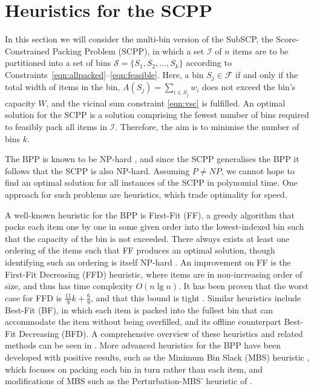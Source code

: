 \documentclass[authoryear]{elsarticle}
\begin{document}
\section{Heuristics for the SCPP}
\label{sec:heur}

\noindent In this section we will consider the multi-bin version of the SubSCP, the Score-Constrained Packing Problem (SCPP), in which a set $\mathcal{I}$ of $n$ items are to be partitioned into a set of bins $\mathcal{S} = \{S_1, S_2,\dotsc,S_k\}$ according to Constraints~\eqref{eqn:allpacked}--\eqref{eqn:feasible}. Here, a bin $S_j \in \mathcal{F}$ if and only if the total width of items in the bin, $A(S_j) = \sum_{i \in S_j} w_i$ does not exceed the bin's capacity $W$, and the vicinal sum constraint \eqref{eqn:vsc} is fulfilled. An optimal solution for the SCPP is a solution comprising the fewest number of bins required to feasibly pack all items in $\mathcal{I}$. Therefore, the aim is to minimise the number of bins $k$.

The BPP is known to be NP-hard \citep{garey1979}, and since the SCPP generalises the BPP it follows that the SCPP is also NP-hard. Assuming $P \neq NP$, we cannot hope to find an optimal solution for all instances of the SCPP in polynomial time. One approach for such problems are heuristics, which trade optimality for speed. 

A well-known heuristic for the BPP is First-Fit (FF), a greedy algorithm that packs each item one by one in some given order into the lowest-indexed bin such that the capacity of the bin is not exceeded. There always exists at least one ordering of the items such that FF produces an optimal solution, though identifying such an ordering is itself NP-hard  \citep{lewis2009}. An improvement on FF is the First-Fit Decreasing (FFD) heuristic, where items are in non-increasing order of size, and thus has time complexity $O(n\lg n)$. It has been proven that the worst case for FFD is $\frac{11}{9}k + \frac{6}{9}$, and that this bound is tight \citep{dosa2007}. Similar heuristics include Best-Fit (BF), in which each item is packed into the fullest bin that can accommodate the item without being overfilled, and its offline counterpart Best-Fit Decreasing (BFD). A comprehensive overview of these heuristics and related methods can be seen in \citet{coffman1984}. More advanced heuristics for the BPP have been developed with positive results, such as the Minimum Bin Slack (MBS) heuristic \citep{gupta1999}, which focuses on packing each bin in turn rather than each item, and modifications of MBS such as the Perturbation-MBS' heuristic of \citet{fleszar2002}. 
\end{document}
